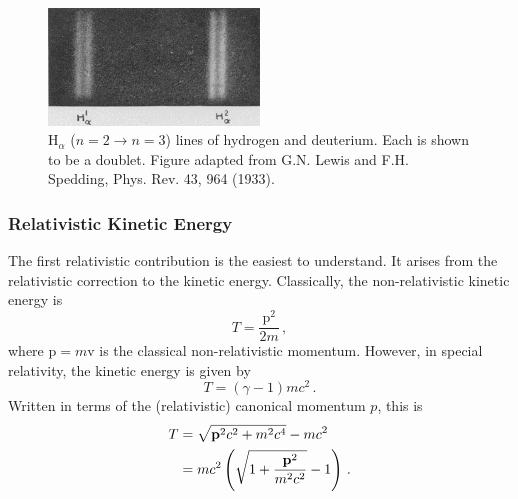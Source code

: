 \documentclass{article}
\theoremstyle{plain}\theoremheaderfont{\normalfont\itshape}\theorembodyfont{\rmfamily}\theoremseparator{.}\newtheorem*{rem}{Remark}\newtheorem*{ex}{Example}\newtheorem*{proof}{Proof}\newtheorem*{altp}{Alternative proof}
\theoremstyle{plain}\theoremheaderfont{\normalfont\bfseries}\theorembodyfont{\rmfamily}\theoremseparator{.}\newtheorem{thm}{Theorem}[section]\newtheorem{lem}[thm]{Lemma}\newtheorem{prop}[thm]{Proposition}\newtheorem*{cor}{Corollary}\newtheorem{defn}[thm]{Definition}\newtheorem{clm}[thm]{Claim}\newtheorem{clminproof}{Claim}
\theoremstyle{break}\theoremheaderfont{\normalfont\itshape}\theorembodyfont{\rmfamily}\theoremseparator{.\medskip}\newtheorem*{proofskip}{Proof}\newtheorem*{exs}{Examples}\newtheorem*{rems}{Remarks}
\theoremstyle{break}\theoremheaderfont{\normalfont\bfseries}\theorembodyfont{\rmfamily}\theoremseparator{.\medskip}\newtheorem{lemskip}[thm]{Lemma}\newtheorem{defnskip}[thm]{Definition}\newtheorem{propskip}[thm]{Proposition}\newtheorem{thmskip}[thm]{Theorem}
\numberwithin{equation}{section}
\newcommand{\vb}[1]{\bm{\mathrm{#1}}}
\begin{document}
    \begin{figure}
        \centering
        \includegraphics[width=0.5\textwidth]{Hydrogen_fine_structure.png}
        \caption{\(\mathrm{H}_\alpha\) (\(n=2\to n=3\)) lines of hydrogen and deuterium. Each is shown to be a doublet. Figure adapted from G.N. Lewis and F.H. Spedding, Phys. Rev. 43, 964 (1933).}
    \end{figure}

    \subsubsection{Relativistic Kinetic Energy}
    The first relativistic contribution is the easiest to understand. It arises from the relativistic correction to the kinetic energy. Classically, the non-relativistic kinetic energy is
    \begin{equation}
        T=\frac{\vb{p}^2}{2m}\,,
    \end{equation}
    where \(\vb{p}=m\vb{v}\) is the classical non-relativistic momentum. However, in special relativity, the kinetic energy is given by
    \begin{equation}
        T=(\gamma-1)mc^2\,.
    \end{equation}
    Written in terms of the (relativistic) canonical momentum \(p\), this is
    \begin{align}
        T&=\sqrt{\vb{p}^2 c^2+m^2 c^4}-mc^2\notag\\
        &=mc^2\left(\sqrt{1+\frac{\vb{p}^2}{m^2c^2}}-1\right)\,.
    \end{align}
\end{document}
